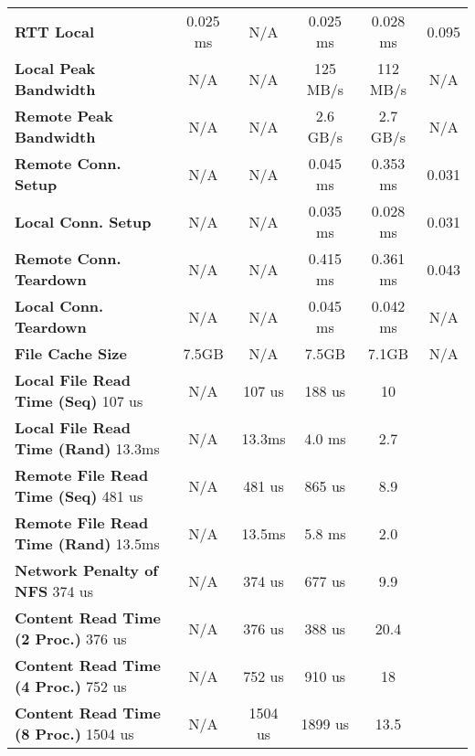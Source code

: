 \begin{table}[ht]
\begin{threeparttable}
\begin{tabular}{lccccc}
  \textbf{RTT Local}  & 0.025 ms & N/A & 0.025 ms & 0.028 ms & 0.095 \\
  \textbf{Local Peak Bandwidth}  & N/A & N/A & 125 MB/s & 112 MB/s & N/A\\
  \textbf{Remote Peak Bandwidth} & N/A & N/A & 2.6 GB/s & 2.7 GB/s & N/A \\
  \textbf{Remote Conn. Setup}  & N/A & N/A & 0.045 ms & 0.353 ms & 0.031 \\
  \textbf{Local Conn. Setup}  & N/A & N/A & 0.035 ms & 0.028 ms & 0.031 \\
  \textbf{Remote Conn. Teardown}  & N/A & N/A & 0.415 ms & 0.361 ms & 0.043 \\
  \textbf{Local Conn. Teardown}  & N/A & N/A & 0.045 ms & 0.042 ms & N/A \\
  \textbf{File Cache Size} & 7.5GB & N/A & 7.5GB & 7.1GB & N/A \\
  \textbf{Local File Read Time (Seq)} 107 us & N/A & 107 us & 188 us & 10 \\
  \textbf{Local File Read Time (Rand)} 13.3ms & N/A & 13.3ms & 4.0 ms & 2.7\\
  \textbf{Remote File Read Time (Seq)} 481 us & N/A & 481 us & 865 us & 8.9 \\
  \textbf{Remote File Read Time (Rand)} 13.5ms & N/A & 13.5ms & 5.8 ms & 2.0\\
  \textbf{Network Penalty of NFS} 374 us & N/A & 374 us & 677 us & 9.9 \\
  \textbf{Content Read Time (2 Proc.)} 376 us & N/A & 376 us & 388 us & 20.4 \\
  \textbf{Content Read Time (4 Proc.)} 752 us & N/A & 752 us & 910 us & 18 \\
  \textbf{Content Read Time (8 Proc.)} 1504 us & N/A & 1504 us & 1899 us & 13.5\\

  \hline
  \end{tabular}
  \end{threeparttable}
  \label{Summary_Table}
\end{table}
